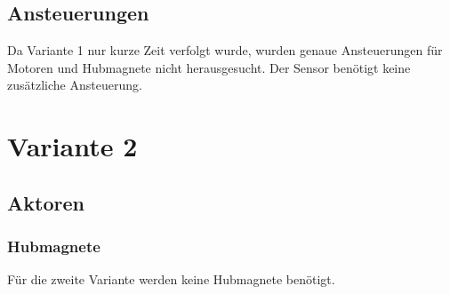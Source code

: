 \subsection{Ansteuerungen}
Da Variante 1 nur kurze Zeit verfolgt wurde, wurden genaue Ansteuerungen für Motoren und Hubmagnete nicht herausgesucht. Der Sensor benötigt keine zusätzliche Ansteuerung.
\newpage
\section{Variante 2}
\subsection{Aktoren}
\subsubsection{Hubmagnete}
Für die zweite Variante werden keine Hubmagnete benötigt.

